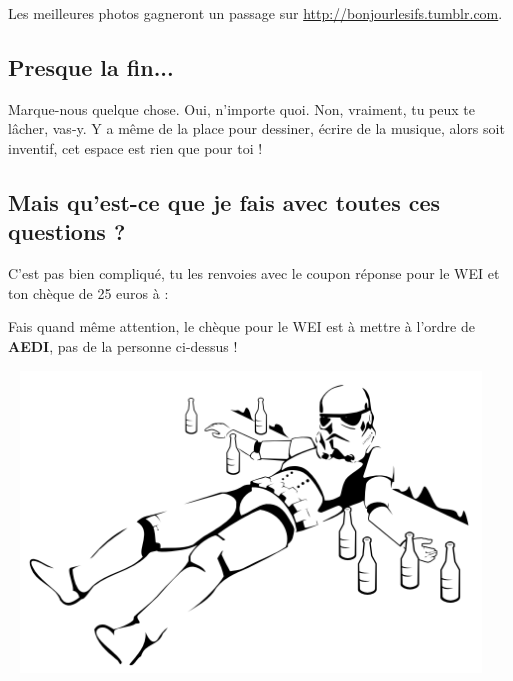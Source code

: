 Les meilleures photos gagneront un passage sur
\url{http://bonjourlesifs.tumblr.com}.
\vspace{1cm}

\subsection*{Presque la fin...}
Marque-nous quelque chose. Oui, n'importe quoi. Non, vraiment, tu peux te
lâcher, vas-y. Y a même de la place pour dessiner, écrire de la musique, alors soit inventif, cet
espace est rien que pour toi !

\newpage

\subsection{Mais qu'est-ce que je fais avec toutes ces questions ?}
C'est pas bien compliqué, tu les renvoies avec le coupon réponse pour le WEI et
ton chèque de 25 euros à :
\vspace{1em}
\adresseCoupon
\vspace{1em}


Fais quand même attention, le chèque pour le WEI est à mettre à l'ordre de \textbf{AEDI}, pas de la personne ci-dessus !

\vfill
\columnbreak
~
\vfill
\hspace{-5cm}
\includegraphics[height=8cm]{images/stormTrooperBourre.png}
